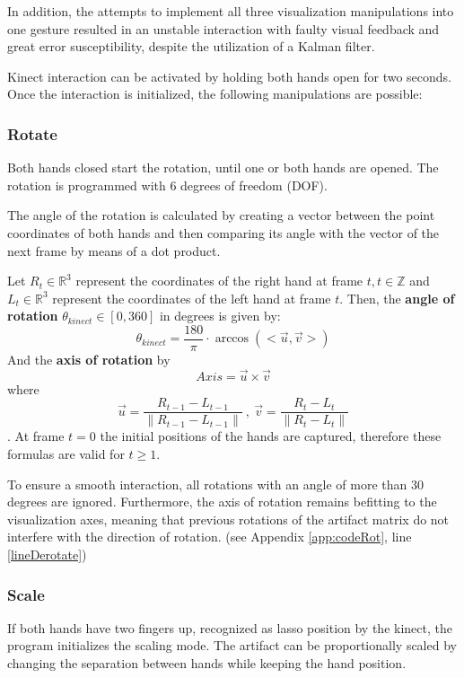 \documentclass[12pt]{extarticle}
\newcommand{\R}{\mathbb{R}}
\newcommand{\Z}{\mathbb{Z}}
\begin{document}
In addition, the attempts to implement all three visualization manipulations into one gesture resulted in an unstable interaction with faulty visual feedback and great error susceptibility, despite the utilization of a Kalman filter.

Kinect interaction can be activated by holding both hands open for two seconds. Once the interaction is initialized, the following manipulations are possible:

\subsubsection {Rotate}\label{subsubsec Rot}
Both hands closed start the rotation, until one or both hands are opened. The rotation is programmed with 6 degrees of freedom (DOF).

The angle of the rotation is calculated by creating a vector between the point coordinates of both hands and then comparing its angle with the vector of the next frame by means of a dot product.

Let $R_t\in \R^3$ represent the coordinates of the right hand at frame $t, t\in \Z$ and $L_t\in\R^3$ represent the coordinates of the left hand at frame $t$. Then, the \textbf{angle of rotation }$\theta_{kinect}\in [0, 360]$ in degrees is given by:
\[\theta_{kinect}=\frac{180}{\pi}\cdot \arccos(<\overrightarrow{u}, \overrightarrow{v}>)\]
And the \textbf{axis of rotation} by
\[Axis=\overrightarrow{u}\times \overrightarrow{v}\]
where $$\overrightarrow{u}=\frac{R_{t-1}-L_{t-1}}{\|R_{t-1}-L_{t-1}\|}\ , \ \overrightarrow{v}=\frac{R_t-L_t}{\|R_t-L_t\|}$$.
At frame $t=0$ the initial positions of the hands are captured, therefore these formulas are valid for $t\geq 1$.

To ensure a smooth interaction, all rotations with an angle of more than 30 degrees are ignored. Furthermore, the axis of rotation remains befitting to the visualization axes, meaning that previous rotations of the artifact matrix do not interfere with the direction of rotation. (see Appendix \ref{app:codeRot}, line \ref{lineDerotate})

\subsubsection {Scale}\label{subsubsec Scale} If both hands have two fingers up, recognized as lasso position by the kinect, the program initializes the scaling mode. The artifact can be proportionally scaled by changing the separation between hands while keeping the hand position.
\end{document}
